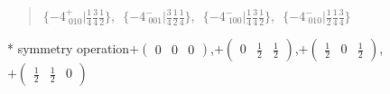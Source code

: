 \documentclass[fleqn,10pt,landscape]{jsarticle}
\begin{document}
\begin{quote}
$\{-4^{+}_{\,\,010}|\frac{1}{4} \frac{3}{4} \frac{1}{2}\}$,\,\, $\{-4^{-}_{\,\,001}|\frac{3}{4} \frac{1}{2} \frac{1}{4}\}$,\,\, $\{-4^{-}_{\,\,100}|\frac{1}{4} \frac{3}{4} \frac{1}{2}\}$,\,\, $\{-4^{-}_{\,\,010}|\frac{1}{2} \frac{1}{4} \frac{3}{4}\}$\newline
\end{quote}

* symmetry operation\quad$+\begin{pmatrix} 0 & 0 & 0 \end{pmatrix}$,\quad $+\begin{pmatrix} 0 & \frac{1}{2} & \frac{1}{2} \end{pmatrix}$,\quad $+\begin{pmatrix} \frac{1}{2} & 0 & \frac{1}{2} \end{pmatrix}$,\quad $+\begin{pmatrix} \frac{1}{2} & \frac{1}{2} & 0 \end{pmatrix}$
\end{document}
